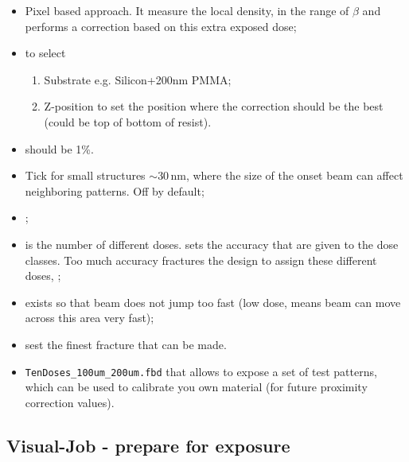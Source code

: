  \begin{itemize}
 \item {}  Pixel based approach. It measure the
   local density,  in the range  of $ \beta  $ and performs a  correction based on  this extra
   exposed dose;
 \item {} to select
   \begin{enumerate}
   \item Substrate e.g. Silicon+200nm PMMA;
   \item Z-position to set the position where the  correction should be the best (could be top
     of bottom of resist).  
   \end{enumerate}
 \item {} should be 1\%.
 \item Tick   for small structures $ \sim 30\,$nm, where
   the size of the onset beam can affect neighboring patterns.  Off by default;
 \item {};
 \item   {}   is   the    number   of   different
   doses.   sets the accuracy  that are given to  the dose classes.   Too much
   accuracy  fractures the  design to  assign these  different doses,  \textbf{};
 \item {} exists  so that beam does not jump too fast  (low dose, means beam
   can move across this area very  fast); 
 \item {} sest the finest fracture that can be made.
 \item {} \ra  \verb|TenDoses_100um_200um.fbd| that allows to expose a  set of test
   patterns, which can be used to calibrate  you own material (for future proximity correction
   values).
 \end{itemize}

 \subsection{Visual-Job - prepare for exposure }
 \label{sec:visual-job-add}


